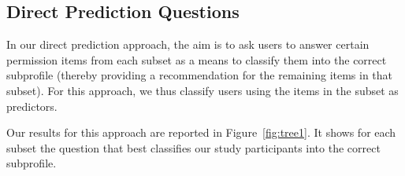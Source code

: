 

\subsection{Direct Prediction Questions}
\label{sec:direct}

In our direct prediction approach, the aim is to ask users to answer certain permission items from each subset as a means to classify them into the correct subprofile (thereby providing a recommendation for the remaining items in that subset). For this approach, we thus classify users using the items in the subset as predictors. 

Our results for this approach are reported in Figure~\ref{fig:tree1}. It shows for each subset the question that best classifies our study participants into the correct subprofile.

